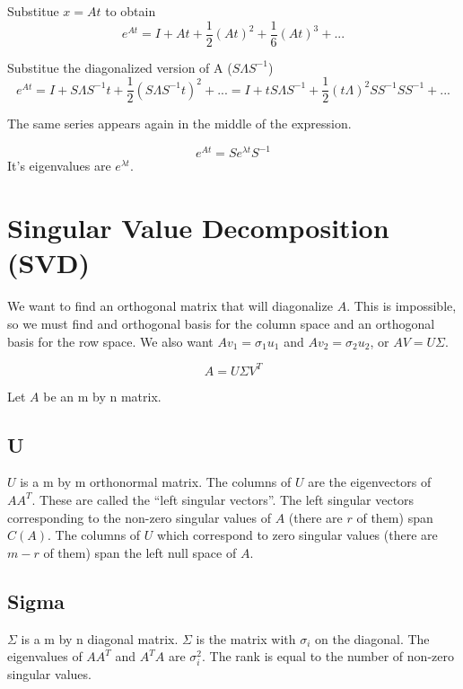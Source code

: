 \documentclass[12pt]{article}
\begin{document}
\begin{itemize}
Substitue $x = At$ to obtain
\begin{equation*}
e^{At} = I + At + \frac{1}{2}(At)^2 + \frac{1}{6}(At)^3 + ...
\end{equation*}

Substitue the diagonalized version of A ($S\Lambda S^{-1}$)
\begin{equation*}
e^{At} = I + S\Lambda S^{-1}t + \frac{1}{2}(S\Lambda S^{-1}t)^2 + ... = I + tS\Lambda S^{-1} + \frac{1}{2}(t\Lambda)^2 S S^{-1} S S^{-1} + ...
\end{equation*}

The same series appears again in the middle of the expression.

\begin{equation*}
e^{At} = S e^{\lambda t} S^{-1} 
\end{equation*}
It's eigenvalues are $e^{\lambda t}$.

\section{Singular Value Decomposition (SVD)}
We want to find an orthogonal matrix that will diagonalize $A$. This is impossible, so we must find and orthogonal basis for the column space and an orthogonal basis for the row space. We also want $Av_1 = \sigma_1 u_1$ and $Av_2 = \sigma_2 u_2$, or $AV = U \Sigma$.

\begin{equation*}
A=U\Sigma V^T 
\end{equation*}

Let $A$ be an m by n matrix.

\subsection{U}
$U$ is a m by m orthonormal matrix. The columns of $U$ are the eigenvectors of $A A^T$. These are called the ``left singular vectors''. The left singular vectors corresponding to the non-zero singular values of $A$ (there are $r$ of them) span $C(A)$. The columns of $U$ which correspond to zero singular values (there are $m-r$ of them) span the left null space of $A$.

\subsection{Sigma}
$\Sigma$ is a m by n diagonal matrix.  $\Sigma$ is the matrix with $\sigma_i$ on the diagonal. The eigenvalues of $AA^T$ and $A^TA$ are $\sigma_i^2$. The rank is equal to the number of non-zero singular values.


\end{itemize}
\end{document}
